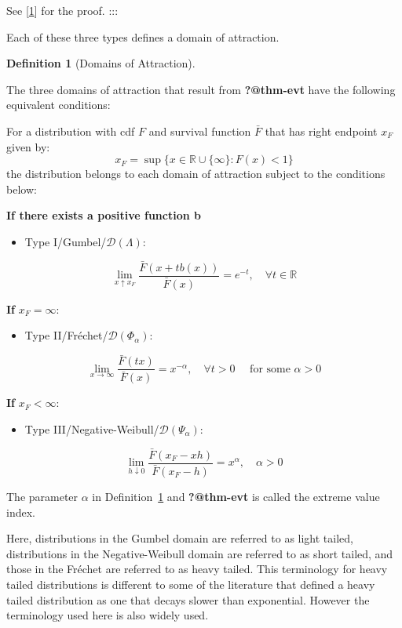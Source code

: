 \documentclass[
  10pt,
  a4paper,
]{scrreprt}
\providecommand{\tightlist}{%
  \setlength{\itemsep}{0pt}\setlength{\parskip}{0pt}}\usepackage{longtable,booktabs,array}
\theoremstyle{definition}
\newtheorem{definition}{Definition}[section]
\theoremstyle{plain}
\theoremstyle{plain}
\theoremstyle{plain}
\theoremstyle{remark}
\begin{document}
{See {[}\protect\hyperlink{ref-haan06}{1}{]} for the proof. :::

Each of these three types defines a domain of attraction.

\begin{definition}[Domains of
Attraction]\protect\hypertarget{def-doa}{}\label{def-doa}

The three domains of attraction that result from \textbf{?@thm-evt} have
the following equivalent conditions:

For a distribution with cdf \(F\) and survival function \(\bar F\) that
has right endpoint \(x_F\) given by: \[
x_F = \sup\{x \in \mathbb R \cup\{\infty\}:F(x)<1\}
\] the distribution belongs to each domain of attraction subject to the
conditions below:

\textbf{If there exists a positive function b}

\begin{itemize}
\tightlist
\item
  Type I/Gumbel/\(\mathcal D(\Lambda)\):
\end{itemize}

\[
\lim_{x\uparrow x_F} \displaystyle\frac{\bar F(x+tb(x))}{\bar F(x)} = e^{-t},\quad \forall t\in\mathbb R
\]

\textbf{If} \(x_F=\infty\):

\begin{itemize}
\tightlist
\item
  Type II/Fréchet/\(\mathcal D (\Phi_\alpha)\):
\end{itemize}

\[
\lim_{x\rightarrow\infty} \displaystyle\frac{\bar F(tx)}{\bar F(x)} = x^{-\alpha}, \quad \forall t>0 \quad \text{ for some } \alpha>0
\]

\textbf{If} \(x_F<\infty\):

\begin{itemize}
\tightlist
\item
  Type III/Negative-Weibull/\(\mathcal D(\Psi_\alpha)\):
\end{itemize}

\[
\lim_{h\downarrow 0}\displaystyle\frac{\bar F(x_F-xh)}{\bar F(x_F-h)} = x^\alpha, \quad\alpha>0
\]

\end{definition}

The parameter \(\alpha\) in Definition~\ref{def-doa} and
\textbf{?@thm-evt} is called the extreme value index.

Here, distributions in the Gumbel domain are referred to as light
tailed, distributions in the Negative-Weibull domain are referred to as
short tailed, and those in the Fréchet are referred to as heavy tailed.
This terminology for heavy tailed distributions is different to some of
the literature that defined a heavy tailed distribution as one that
decays slower than exponential. However the terminology used here is
also widely used.

}
\end{document}

